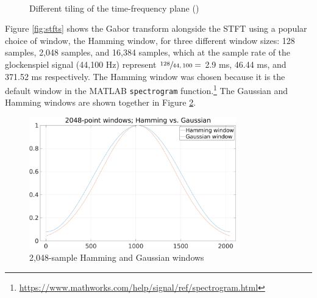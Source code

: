 \documentclass[report.tex]{subfiles}
\begin{document}
\begin{figure}[ht]
	\centering
	\\
	\caption{Different tiling of the time-frequency plane (\cite[326, 327]{gabordiagrams})}
	\label{fig:gabortf}
\end{figure}

Figure \ref{fig:stfts} shows the Gabor transform alongside the STFT using a popular choice of window, the Hamming window, for three different window sizes: 128 samples, 2,048 samples, and 16,384 samples, which at the sample rate of the glockenspiel signal (44,100 Hz) represent $\sfrac{128}{44,100} =$ 2.9 ms, 46.44 ms, and 371.52 ms respectively. The Hamming window was chosen because it is the default window in the MATLAB \Verb#spectrogram# function.\footnote{\url{https://www.mathworks.com/help/signal/ref/spectrogram.html}} The Gaussian and Hamming windows are shown together in Figure \ref{fig:gaussvshamm}.

\begin{figure}[ht]
	\centering
	\includegraphics[width=0.8\textwidth]{./images-tftheory/hamming_vs_gauss.png}
	\caption{2,048-sample Hamming and Gaussian windows}
	\label{fig:gaussvshamm}
\end{figure}
\end{document}
